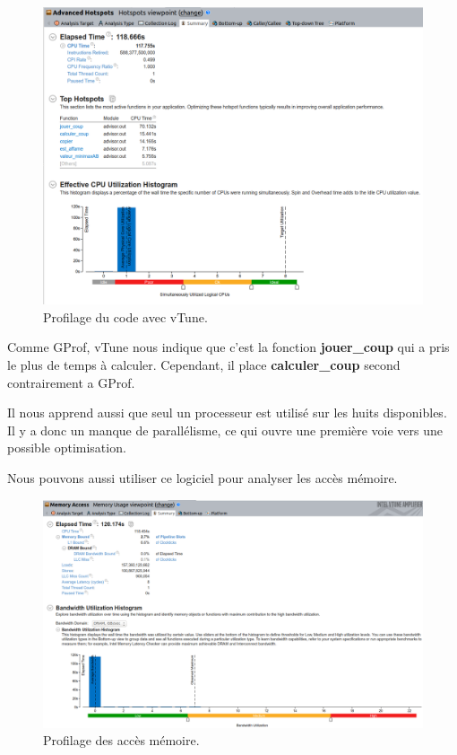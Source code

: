 \documentclass[
 aip,
 jmp,
 amsmath,amssymb,
 reprint
]{revtex4-1}
\begin{document}
\begin{figure}[H]
  \includegraphics[width=\linewidth, keepaspectratio=true]{vtune.png}
  \caption{Profilage du code avec vTune.\label{Fig:vTune_sequentiel_cpu}}
\end{figure}

Comme GProf, vTune nous indique que c'est la fonction \textbf{jouer\_coup} qui a pris le plus de temps à calculer. Cependant, il place \textbf{calculer\_coup} second contrairement a GProf.\par
Il nous apprend aussi que seul un processeur est utilisé sur les huits disponibles. Il y a donc un manque de parallélisme, ce qui ouvre une première voie vers une possible optimisation.\par
Nous pouvons aussi utiliser ce logiciel pour analyser les accès mémoire.

\begin{figure}[H]
  \includegraphics[width=\linewidth, keepaspectratio=true]{memory_vtune.png}
  \caption{Profilage des accès mémoire.\label{Fig:vTune_sequentiel_mem}}
\end{figure}
\end{document}
